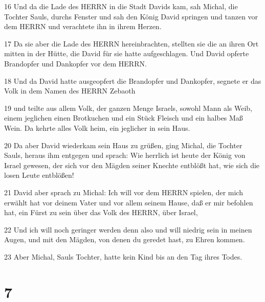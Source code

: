 \par 16 Und da die Lade des HERRN in die Stadt Davids kam, sah Michal, die Tochter Sauls, durchs Fenster und sah den König David springen und tanzen vor dem HERRN und verachtete ihn in ihrem Herzen.
\par 17 Da sie aber die Lade des HERRN hereinbrachten, stellten sie die an ihren Ort mitten in der Hütte, die David für sie hatte aufgeschlagen. Und David opferte Brandopfer und Dankopfer vor dem HERRN.
\par 18 Und da David hatte ausgeopfert die Brandopfer und Dankopfer, segnete er das Volk in dem Namen des HERRN Zebaoth
\par 19 und teilte aus allem Volk, der ganzen Menge Israels, sowohl Mann als Weib, einem jeglichen einen Brotkuchen und ein Stück Fleisch und ein halbes Maß Wein. Da kehrte alles Volk heim, ein jeglicher in sein Haus.
\par 20 Da aber David wiederkam sein Haus zu grüßen, ging Michal, die Tochter Sauls, heraus ihm entgegen und sprach: Wie herrlich ist heute der König von Israel gewesen, der sich vor den Mägden seiner Knechte entblößt hat, wie sich die losen Leute entblößen!
\par 21 David aber sprach zu Michal: Ich will vor dem HERRN spielen, der mich erwählt hat vor deinem Vater und vor allem seinem Hause, daß er mir befohlen hat, ein Fürst zu sein über das Volk des HERRN, über Israel,
\par 22 Und ich will noch geringer werden denn also und will niedrig sein in meinen Augen, und mit den Mägden, von denen du geredet hast, zu Ehren kommen.
\par 23 Aber Michal, Sauls Tochter, hatte kein Kind bis an den Tag ihres Todes.

\chapter{7}

